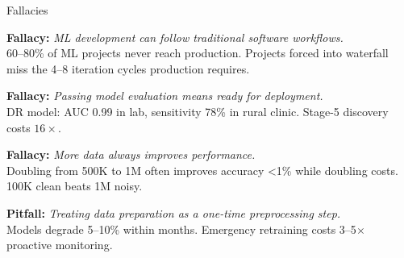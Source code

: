 \documentclass[aspectratio=169, 12pt]{beamer}
\begin{document}
\begin{frame}{Fallacies}
\note{
%
%
}

\footnotesize
\textbf{Fallacy:} \textit{ML development can follow traditional software workflows.}\\
{\scriptsize 60--80\% of ML projects never reach production. Projects forced into waterfall miss the 4--8 iteration cycles production requires.}

\vspace{0.05cm}
\textbf{Fallacy:} \textit{Passing model evaluation means ready for deployment.}\\
{\scriptsize DR model: AUC 0.99 in lab, sensitivity 78\% in rural clinic. Stage-5 discovery costs $16\times$.}

\vspace{0.05cm}
\textbf{Fallacy:} \textit{More data always improves performance.}\\
{\scriptsize Doubling from 500K to 1M often improves accuracy <1\% while doubling costs. 100K clean beats 1M noisy.}

\vspace{0.05cm}
\textbf{Pitfall:} \textit{Treating data preparation as a one-time preprocessing step.}\\
{\scriptsize Models degrade 5--10\% within months. Emergency retraining costs 3--5$\times$ proactive monitoring.}

\end{frame}
\end{document}
